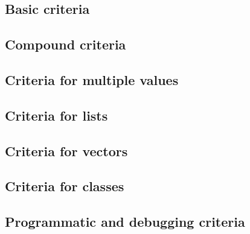 \documentclass{article}
\begin{document}
\subsection{Basic criteria}












\subsection{Compound criteria}







\subsection{Criteria for multiple values}



\subsection{Criteria for lists}



\subsection{Criteria for vectors}

\subsection{Criteria for classes}

\subsection{Programmatic and debugging criteria}





\end{document}
